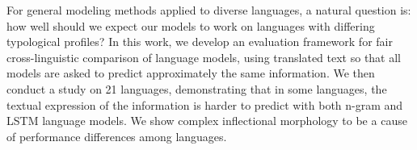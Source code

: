 For general modeling methods applied to diverse languages, a natural question is: how well should we expect our models to work on languages with differing typological profiles? In this work, we develop an evaluation framework for fair cross-linguistic comparison of language models, using translated text so that all models are asked to predict approximately the same information. We then conduct a study on 21 languages, demonstrating that in some languages, the textual expression of the information is harder to predict with both n-gram and LSTM language models. We show complex inflectional morphology to be a cause of performance differences among languages.
